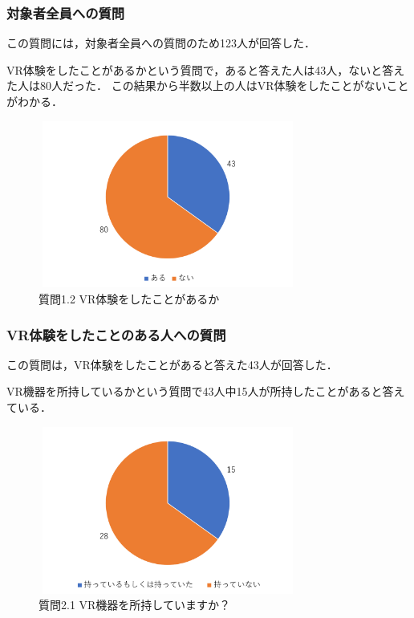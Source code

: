 \documentclass[12pt,a4j]{ltjsarticle}
\begin{document}
\subsubsection{対象者全員への質問}
この質問には，対象者全員への質問のため123人が回答した．

VR体験をしたことがあるかという質問で，あると答えた人は43人，ないと答えた人は80人だった．
この結果から半数以上の人はVR体験をしたことがないことがわかる．

\begin{figure}[h]
\begin{center}
 \includegraphics[clip,width=85mm,height=55mm]{アンケート結果1_1_2.pdf}
\end{center}
 \caption{質問1.2 VR体験をしたことがあるか}
 \label{fig:アンケート結果1_1_2.pdf}
\end{figure}

\subsubsection{VR体験をしたことのある人への質問}
この質問は，VR体験をしたことがあると答えた43人が回答した．

VR機器を所持しているかという質問で43人中15人が所持したことがあると答えている．

\begin{figure}[h]
\begin{center}
 \includegraphics[clip,width=85mm,height=55mm]{アンケート結果1_2_1.pdf}
\end{center}
 \caption{質問2.1 VR機器を所持していますか？}
 \label{fig:アンケート結果1_2_1.pdf}
\end{figure}
\end{document}
